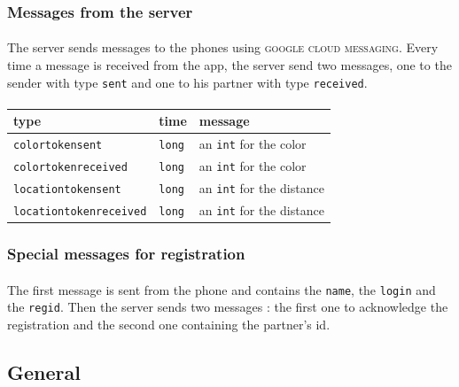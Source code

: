 \documentclass[12pt]{article}
\begin{document}
\subsubsection{Messages from the server}

\paragraph{}The server sends messages to the phones using \textsc{google cloud messaging}. Every time a message is received from the app, the server send two messages, one to the sender with type \verb?sent? and one to his partner with type \verb?received?.
\paragraph{}
\begin{tabular}{l|l|l}
type & time & message \\
\hline
\hline
\verb?colortokensent? & \verb?long? & an \verb?int? for the color \\
\verb?colortokenreceived? & \verb?long? & an \verb?int? for the color \\
\verb?locationtokensent? & \verb?long? & an \verb?int? for the distance \\
\verb?locationtokenreceived? & \verb?long? & an \verb?int? for the distance \\
\end{tabular}


\subsubsection{Special messages for registration}
\paragraph{}The first message is sent from the phone and contains the \verb?name?, the \verb?login? and the \verb?regid?. Then the server sends two messages : the first one to acknowledge the registration and the second one containing the partner's id.


\newpage
\subsection{General}
\end{document}
